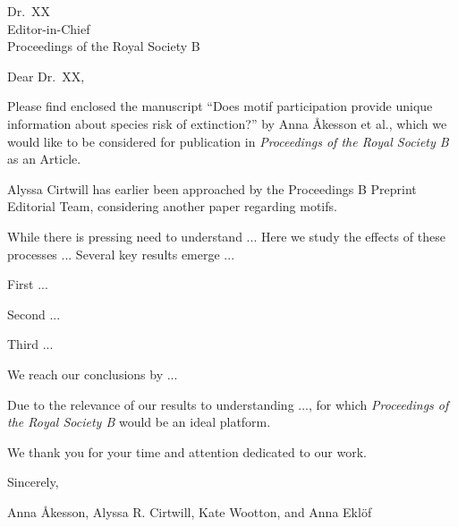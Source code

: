 \documentclass[11pt]{letter}
\date{October XX, 2021}
\begin{document}
\begin{letter}{
\vspace{-2.5cm}

Dr.~XX\\
Editor-in-Chief\\
Proceedings of the Royal Society B} %


\opening{Dear Dr.~XX,}

Please find enclosed the manuscript ``Does motif participation provide unique information about species risk of extinction?'' by Anna {\AA}kesson et al., which we would like to be considered for publication in \emph{Proceedings of the Royal Society B} as an Article.

Alyssa Cirtwill has earlier been approached by the Proceedings B Preprint Editorial Team, considering another paper regarding motifs.

While there is pressing need to understand ...
Here we study the effects of these processes ... 
Several key results emerge ...

First ...

Second ...

Third ...

We reach our conclusions by ...

Due to the relevance of our results to understanding ..., for which \emph{ Proceedings of the Royal Society B} would be an ideal platform.

We thank you for your time and attention dedicated to our work.

\vspace{2\parskip}

\hspace{4\parskip} Sincerely,

\hspace{4\parskip} Anna {\AA}kesson, Alyssa R. Cirtwill, Kate Wootton, and Anna Ekl\"of


\end{letter} 
\end{document}
